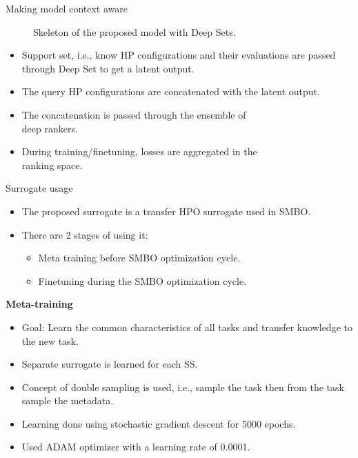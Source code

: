 \documentclass{beamer}
\begin{document}
\begin{frame}[t]{Making model context aware}
\begin{figure}[htb]
\begin{tikzpicture}
\end{tikzpicture}
\caption{Skeleton of the proposed model with Deep Sets.}
\label{fig:proposeModelDeepSets}
\end{figure}

\begin{itemize}
\item Support set, i.e., know HP configurations and their evaluations are passed through Deep Set to get a latent output.
\item The query HP configurations are concatenated with the latent output.
\item The concatenation is passed through the ensemble of \\
deep rankers.
\item During training/finetuning, losses are aggregated in the\\
 ranking space.
\end{itemize}

\end{frame}

\begin{frame}[t]{Surrogate usage}

\begin{itemize}
\item The proposed surrogate is a transfer HPO surrogate used in SMBO.
\item There are 2 stages of using it:
\begin{itemize}
\item Meta training before SMBO optimization cycle.
\item Finetuning during the SMBO optimization cycle.
\end{itemize}
\end{itemize}

\textbf{Meta-training}
\begin{itemize}
\item Goal: Learn the common characteristics of all tasks and transfer knowledge to the new task.
\item Separate surrogate is learned for each SS.
\item Concept of double sampling is used, i.e., sample the task then from the task sample the metadata.
\item Learning done using stochastic gradient descent for 5000 epochs.
\item Used ADAM optimizer with a learning rate of 0.0001. 
\end{itemize}

\end{frame}
\end{document}
